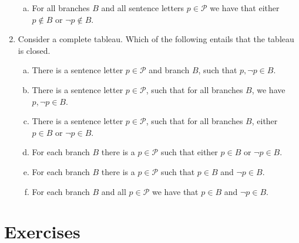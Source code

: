 \begin{enumerate}[\thesection.1]
\begin{enumerate}[(a)]
			\item For all branches $B$ and all sentence letters $p\in \mathcal{P}$ we have that either $p\notin B$ or $\neg p\notin B$.	
								
		\end{enumerate}

		\item Consider a complete tableau. Which of the following entails that the tableau is closed.
		
		\begin{enumerate}[(a)]
		
			\item There is a sentence letter $p\in\mathcal{P}$ and branch $B$, such that $p,\neg p\in B$.
			
			\item There is a sentence letter $p\in\mathcal{P}$, such that for all branches $B$, we have $p,\neg p\in B$.
			
			\item There is a sentence letter $p\in\mathcal{P}$, such that for all branches $B$, either $p\in B$ or $\neg p\in B$.
			
			\item For each branch $B$ there is a $p\in\mathcal{P}$ such that either $p\in B$ or $\neg p\in B$.
			
			\item For each branch $B$ there is a $p\in\mathcal{P}$ such that $p\in B$ and $\neg p\in B$.
			
			\item For each branch $B$ and all $p\in\mathcal{P}$ we have that $p\in B$ and $\neg p\in B$.
								
		\end{enumerate}


	\end{enumerate}

\section{Exercises}



